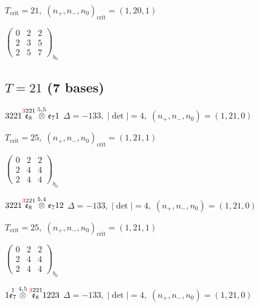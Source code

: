 \documentclass[10pt]{article}
\begin{document}
\hspace{1em}$T_{\text{crit}}=21,\; (n_+,n_-,n_0)_{\text{crit}}=(1,20,1)$

\hspace{2em}$\left(\begin{smallmatrix}0 & 2 & 2 \\ 2 & 3 & 5 \\ 2 & 5 & 7\end{smallmatrix}\right)_{\!b_0}$


\subsection*{$T = 21$ \quad (7 bases)}
\smallskip

$3221\overset{\textcolor{red}{3}221}{\mathfrak{e}_8}\overset{5,5}{\otimes}\mathfrak{e}_71$ \quad $\Delta=-133,\; |\det|=4,\; (n_+,n_-,n_0)=(1,21,0)$

\hspace{1em}$T_{\text{crit}}=25,\; (n_+,n_-,n_0)_{\text{crit}}=(1,21,1)$

\hspace{2em}$\left(\begin{smallmatrix}0 & 2 & 2 \\ 2 & 4 & 4 \\ 2 & 4 & 4\end{smallmatrix}\right)_{\!b_0}$

\smallskip

$3221\overset{\textcolor{red}{3}221}{\mathfrak{e}_8}\overset{5,4}{\otimes}\mathfrak{e}_712$ \quad $\Delta=-133,\; |\det|=4,\; (n_+,n_-,n_0)=(1,21,0)$

\hspace{1em}$T_{\text{crit}}=25,\; (n_+,n_-,n_0)_{\text{crit}}=(1,21,1)$

\hspace{2em}$\left(\begin{smallmatrix}0 & 2 & 2 \\ 2 & 4 & 4 \\ 2 & 4 & 4\end{smallmatrix}\right)_{\!b_0}$

\smallskip

$1\overset{1}{\mathfrak{e}_7}\overset{4,5}{\otimes}\overset{\textcolor{red}{3}221}{\mathfrak{e}_8}1223$ \quad $\Delta=-133,\; |\det|=4,\; (n_+,n_-,n_0)=(1,21,0)$
\end{document}
